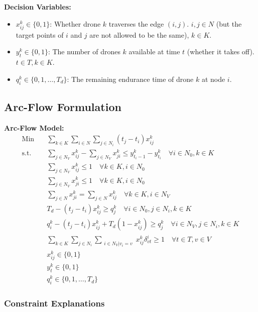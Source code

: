 \documentclass[preprint,review,12pt,3p,authoryear]{elsarticle}
\begin{document}
\textbf{Decision Variables:}
\begin{itemize}
    \item $x_{ij}^k \in \{0,1\}$: Whether drone $k$ traverses the edge $(i,j)$. $i,j \in N$ (but the target points of $i$ and $j$ are not allowed to be the same), $k \in K$.
    \item $y_t^k \in \{0,1\}$: The number of drones $k$ available at time $t$ (whether it takes off). $t \in T, k \in K$.
    \item $q_i^k \in \{0,1,\ldots,T_d\}$: The remaining endurance time of drone $k$ at node $i$.
\end{itemize}

\subsection{Arc-Flow Formulation}

\textbf{Arc-Flow Model:}
\begin{align}
    \text{Min} \quad & \sum_{k \in K} \sum_{i \in N} \sum_{j \in N_i} (t_j - t_i) x_{ij}^k \tag{1} \\
    \text{s.t.} \quad & \sum_{j \in N_V} x_{ij}^k - \sum_{j \in N_V} x_{ji}^k \leq y_{t_i - 1}^k - y_{t_i}^k \quad \forall i \in N_0, k \in K \tag{2} \\
    & \sum_{j \in N_V} x_{ij}^k \leq 1 \quad \forall k \in K, i \in N_0 \tag{3} \\
    & \sum_{j \in N_V} x_{ji}^k \leq 1 \quad \forall k \in K, i \in N_0 \tag{4} \\
    & \sum_{j \in N} x_{ji}^k = \sum_{j \in N} x_{ij}^k \quad \forall k \in K, i \in N_V \tag{5} \\
    & T_d - (t_j - t_i) x_{ij}^k \geq q_j^k \quad \forall i \in N_0, j \in N_i, k \in K \tag{6} \\
    & q_i^k - (t_j - t_i) x_{ij}^k + T_d (1 - x_{ij}^k) \geq q_j^k \quad \forall i \in N_V, j \in N_i, k \in K \tag{7} \\
    & \sum_{k \in K} \sum_{j \in N_i} \sum_{\substack{i \in N_V | v_i = v}} x_{ij}^k \delta_{vt}^i \geq 1 \quad \forall t \in T, v \in V \tag{8} \\
    & x_{ij}^k \in \{0,1\} \tag{9} \\
    & y_t^k \in \{0,1\} \tag{10} \\
    & q_i^k \in \{0,1,\ldots,T_d\} \tag{11}
\end{align}

\subsubsection{Constraint Explanations}
\end{document}
